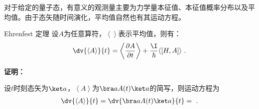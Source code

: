 

对于给定的量子态，有意义的观测量主要为力学量本征值、本征值概率分布以及平均值。由于态矢随时间演化，平均值自然也有其运动方程。
\begin{theorem}{Ehrenfest 定理}
设$A$为任意算符，$\left\langle\right\rangle$表示平均值，则有：
\begin{equation}
\dv{\left\langle A \right\rangle}{t}=\left\langle\frac{\partial A}{\partial t}\right\rangle+\frac{\I}{\hbar}\langle[H, A]\rangle~.
\end{equation}
\end{theorem}

\textbf{证明：}

设$t$时刻态矢为$\ket a$，$\left\langle A\right\rangle$为$\bra a A(t)\ket a$的简写，则运动方程为
\begin{equation}
\begin{aligned}
\dv{\left\langle A \right\rangle}{t}=\dv{\bra a A(t)\ket a}{t}=~.
\end{aligned}
\end{equation}



